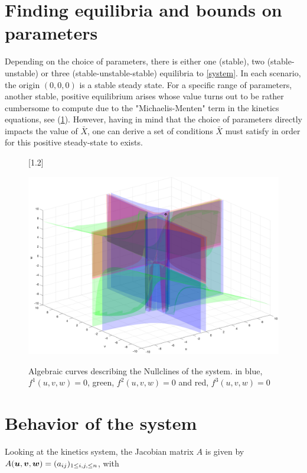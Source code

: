 \section{Finding equilibria and bounds on parameters}

Depending on the choice of parameters, there is either one (stable), two (stable-unstable) or three (stable-unstable-stable) equilibria to \ref{system}. In each scenario, the origin $(0, 0, 0)$ is a stable steady state. For a specific range of parameters, another stable, positive equilibrium arises whose value turns out to be rather cumbersome to compute due to the "Michaelis-Menten" term in the kinetics equations, see (\ref{fig:nullclines}). However, having in mind that the choice of parameters directly impacts the value of $\bar X$, one can derive a set of conditions $\bar X$ must satisfy in order for this positive steady-state to exists.

\begin{figure}[h]
	[1.2\FBwidth]
	{\caption{Algebraic curves describing the Nullclines of the system. in blue, $f^1(u, v, w) = 0$, green, $f^2(u, v, w) = 0$ and red, $f^3(u, v, w) = 0$ }\label{fig:nullclines}}
	{\includegraphics[width=\linewidth]{figures/nullclines.png}}
\end{figure}

\section{Behavior of the system}

Looking at the kinetics system, the Jacobian matrix $A$ is given by $A(\bm{u}, \bm{v}, \bm{w}) = (a_{ij})_{1 \le i, j, \le n}$, with


